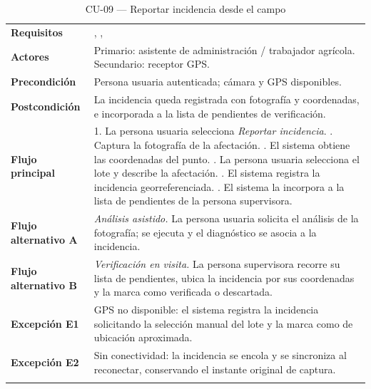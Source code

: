\begin{longtable}{|L{3.4cm}|L{12.0cm}|}
\hline
{}\\
\hline
\textbf{Requisitos} & , ,  \\ \hline
\textbf{Actores} & Primario: asistente de administración / trabajador agrícola. Secundario: receptor GPS. \\ \hline
\textbf{Precondición} & Persona usuaria autenticada; cámara y GPS disponibles. \\ \hline
\textbf{Postcondición} & La incidencia queda registrada con fotografía y coordenadas, e incorporada a la lista de pendientes de verificación. \\ \hline
\textbf{Flujo principal} & 1. La persona usuaria selecciona \emph{Reportar incidencia}. . Captura la fotografía de la afectación. . El sistema obtiene las coordenadas del punto. . La persona usuaria selecciona el lote y describe la afectación. . El sistema registra la incidencia georreferenciada. . El sistema la incorpora a la lista de pendientes de la persona supervisora. \\ \hline
\textbf{Flujo alternativo A} & \emph{Análisis asistido.} La persona usuaria solicita el análisis de la fotografía; se ejecuta  y el diagnóstico se asocia a la incidencia. \\ \hline
\textbf{Flujo alternativo B} & \emph{Verificación en visita.} La persona supervisora recorre su lista de pendientes, ubica la incidencia por sus coordenadas y la marca como verificada o descartada. \\ \hline
\textbf{Excepción E1} & GPS no disponible: el sistema registra la incidencia solicitando la selección manual del lote y la marca como de ubicación aproximada. \\ \hline
\textbf{Excepción E2} & Sin conectividad: la incidencia se encola y se sincroniza al reconectar, conservando el instante original de captura. \\ \hline
\caption{CU-09 --- Reportar incidencia desde el campo}
\end{longtable}

